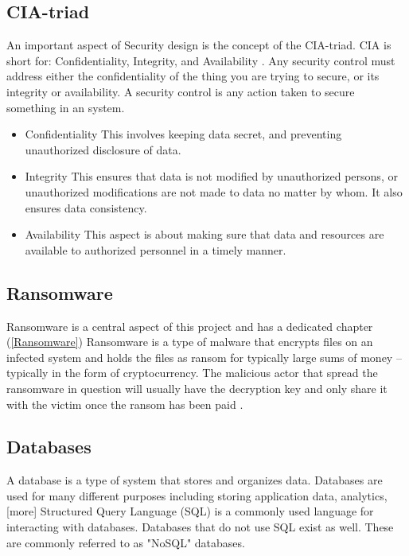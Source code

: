 \subsection{CIA-triad} \label{CIA}
An important aspect of Security design is the concept of the CIA-triad. CIA is short for: Confidentiality, Integrity, and Availability \cite{laan_it_2017}. Any security control must address either the confidentiality of the thing you  are trying to secure, or its integrity or availability. A security control is any action taken to secure something in an system. 
\begin{itemize}
    \item Confidentiality
       \newline
        This involves keeping data secret, and preventing unauthorized disclosure of data.
    \item Integrity
    \newline
    This ensures that data is not modified by unauthorized persons, or unauthorized modifications are not made to data no matter by whom. It also ensures data consistency. 
    \item Availability
    \newline
    This aspect is about making sure that data and resources are available to authorized personnel in a timely manner. 
\end{itemize}


\subsection{Ransomware}
Ransomware is a central aspect of this project and has a dedicated chapter (\ref{Ransomware}) Ransomware is a type of malware that encrypts files on an infected system and holds the files as ransom for typically large sums of money -- typically in the form of cryptocurrency. The malicious actor that spread the ransomware in question will usually have the decryption key and only share it with the victim once the ransom has been paid \cite{hassan_ransomware_2019}.

\subsection{Databases}

A database is a type of system that stores and organizes data.
Databases are used for many different purposes including storing application data, analytics, [more]
Structured Query Language (SQL) is a commonly used language for interacting with databases.
Databases that do not use SQL exist as well.
These are commonly referred to as "NoSQL" databases.


